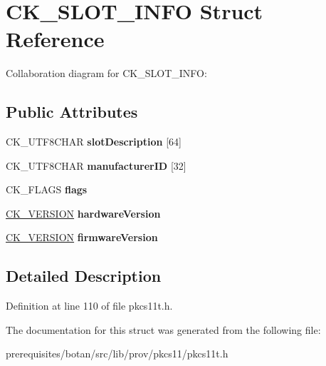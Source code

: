 \hypertarget{struct_c_k___s_l_o_t___i_n_f_o}{}\section{C\+K\+\_\+\+S\+L\+O\+T\+\_\+\+I\+N\+FO Struct Reference}
\label{struct_c_k___s_l_o_t___i_n_f_o}


Collaboration diagram for C\+K\+\_\+\+S\+L\+O\+T\+\_\+\+I\+N\+FO\+:
\subsection*{Public Attributes}
\begin{DoxyCompactItemize}
\item 
\mbox{\label{struct_c_k___s_l_o_t___i_n_f_o_a54a968ef99d631f025b426d32fe13648}} 
C\+K\+\_\+\+U\+T\+F8\+C\+H\+AR {\bfseries slot\+Description} \mbox{[}64\mbox{]}
\item 
\mbox{\label{struct_c_k___s_l_o_t___i_n_f_o_ab76f9ea77a8903171f203519550b89c8}} 
C\+K\+\_\+\+U\+T\+F8\+C\+H\+AR {\bfseries manufacturer\+ID} \mbox{[}32\mbox{]}
\item 
\mbox{\label{struct_c_k___s_l_o_t___i_n_f_o_a21bfc612263b8eb1d1773695872fc181}} 
C\+K\+\_\+\+F\+L\+A\+GS {\bfseries flags}
\item 
\mbox{\label{struct_c_k___s_l_o_t___i_n_f_o_aad99fb4180cd096d7ba0b9592b19445a}} 
\mbox{\hyperlink{struct_c_k___v_e_r_s_i_o_n}{C\+K\+\_\+\+V\+E\+R\+S\+I\+ON}} {\bfseries hardware\+Version}
\item 
\mbox{\label{struct_c_k___s_l_o_t___i_n_f_o_a32f9a9f097841afa2064c0b1a00b77fd}} 
\mbox{\hyperlink{struct_c_k___v_e_r_s_i_o_n}{C\+K\+\_\+\+V\+E\+R\+S\+I\+ON}} {\bfseries firmware\+Version}
\end{DoxyCompactItemize}


\subsection{Detailed Description}


Definition at line 110 of file pkcs11t.\+h.



The documentation for this struct was generated from the following file\+:\begin{DoxyCompactItemize}
\item 
prerequisites/botan/src/lib/prov/pkcs11/pkcs11t.\+h\end{DoxyCompactItemize}
